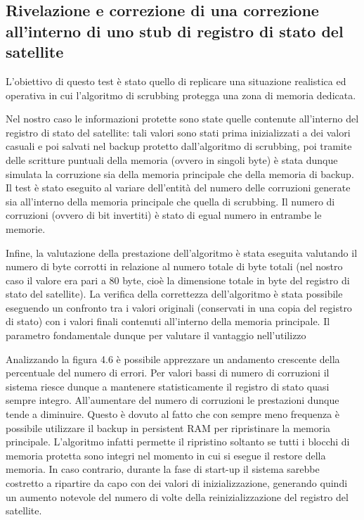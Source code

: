 \documentclass[LaM,binding=0.6cm]{../sapthesis}
\begin{document}
\subsection{Rivelazione e correzione di una correzione all'interno di uno stub di registro di stato del satellite}

L'obiettivo di questo test è stato quello di replicare una situazione realistica ed operativa in cui l'algoritmo di scrubbing protegga una zona di memoria dedicata. 

Nel nostro caso le informazioni protette sono state quelle contenute all'interno del registro di stato del satellite: tali valori sono stati prima inizializzati a dei valori casuali e poi salvati nel backup protetto dall'algoritmo di scrubbing, poi tramite delle scritture puntuali della memoria (ovvero in singoli byte) è stata dunque simulata la corruzione sia della memoria principale che della memoria di backup. \newline\newline
Il test è stato eseguito al variare dell'entità del numero delle corruzioni generate sia all'interno della memoria principale che quella di scrubbing. Il numero di corruzioni (ovvero di bit invertiti) è stato di egual numero in entrambe le memorie.

Infine, la valutazione della prestazione dell'algoritmo è stata eseguita valutando il numero di byte corrotti in relazione al numero totale di byte totali (nel nostro caso il valore era pari a 80 byte, cioè la dimensione totale in byte del registro di stato del satellite). 
La verifica della correttezza dell'algoritmo è stata possibile eseguendo un confronto tra i valori originali (conservati in una copia del registro di stato) con i valori finali contenuti all'interno della memoria principale. Il parametro fondamentale dunque per valutare il vantaggio nell'utilizzo 

\newpage

Analizzando la figura 4.6 è possibile apprezzare un andamento crescente della percentuale del numero di errori. Per valori bassi di numero di corruzioni il sistema riesce dunque a mantenere statisticamente il registro di stato quasi sempre integro. All'aumentare del numero di corruzioni le prestazioni dunque tende a diminuire. Questo è dovuto al fatto che con sempre meno frequenza è possibile utilizzare il backup in persistent RAM per ripristinare la memoria principale. L'algoritmo infatti permette il ripristino soltanto se tutti i blocchi di memoria protetta sono integri nel momento in cui si esegue il restore della memoria. In caso contrario, durante la fase di start-up il sistema sarebbe costretto a ripartire da capo con dei valori di inizializzazione, generando quindi un aumento notevole del numero di volte della reinizializzazione del registro del satellite. 
\end{document}
